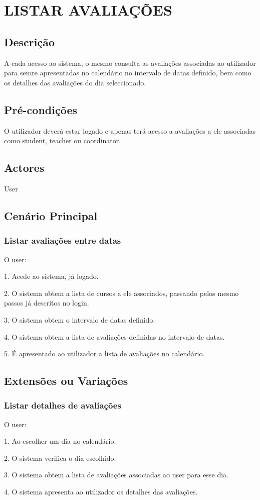 \section{LISTAR AVALIAÇÕES}

\subsection{Descrição}
A cada acesso ao sistema, o mesmo consulta as avaliações associadas ao utilizador para semre apresentadas no calendário no intervalo de datas definido, bem como os detalhes das avaliações do dia seleccionado.

\subsection{Pré-condições}
O utilizador deverá estar logado e apenas terá acesso a avaliações a ele associadas como student, teacher ou coordinator.

\subsection{Actores}
User

\subsection{Cenário Principal}

\subsubsection{Listar avaliações entre datas} 
O user:

1. Acede ao sistema, já logado.

2. O sistema obtem a lista de cursos a ele associados, passando pelos mesmo passos já descritos no login.

3. O sistema obtem o intervalo de datas definido.

4. O sistema obtem a lista de avaliações definidas no intervalo de datas.

5. É apresentado ao utilizador a lista de avaliações no calendário.

\subsection{Extensões ou Variações} 
\subsubsection{Listar detalhes de avaliações}

O user:

1. Ao escolher um dia no calendário.

2. O sistema verifica o dia escolhido.

3. O sistema obtem a lista de avaliações associadas ao user para esse dia.

4. O sistema apresenta ao utilizador os detalhes das avaliações. 